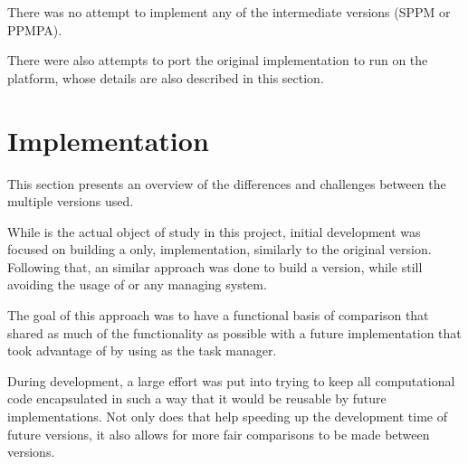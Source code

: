 \documentclass[main.tex]{subfiles}
\begin{document}
There was no attempt to implement any of the intermediate versions (SPPM or PPMPA).

There were also attempts to port the original implementation to run on the \mic platform, whose details are also described in this section.




\section{Implementation}

This section presents an overview of the differences and challenges between the multiple versions used.

While \starpu is the actual object of study in this project, initial development was focused on building a \cpu only, implementation, similarly to the original version. Following that, an similar approach was done to build a \cuda version, while still avoiding the usage of \starpu or any \hetplat managing system.

The goal of this approach was to have a functional basis of comparison that shared as much of the functionality as possible with a future implementation that took advantage of \hetplats by using \starpu as the task manager.

During development, a large effort was put into trying to keep all computational code encapsulated in such a way that it would be reusable by future implementations. Not only does that help speeding up the development time of future versions, it also allows for more fair comparisons to be made between versions.




%

\end{document}
